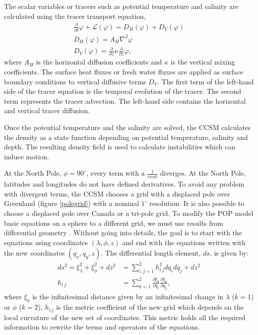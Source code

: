 The scalar variables or tracers such as potential temperature and salinity are calculated using the tracer transport equation,
\begingroup \belowdisplayskip=0pt \abovedisplayskip=0pt
\begin{gather}
\frac{\partial}{\partial t}\varphi + \mathcal{L}(\varphi) = D_H(\varphi)+D_V(\varphi)\\
D_H(\varphi) = A_H\nabla^2\varphi\\
D_V(\varphi) = \frac{\partial}{\partial z}\kappa\frac{\partial}{\partial z}\varphi,
\end{gather}
\endgroup
where $A_H$ is the horizontal diffusion coefficients and $\kappa$ is the vertical mixing coefficients. The surface heat fluxes or fresh water fluxes are applied as surface boundary conditions to vertical diffusive terms $D_V$. The first term of the left-hand side of the tracer equation is the temporal evolution of the tracer. The second term represents the tracer advection. The left-hand side contains the horizontal and vertical tracer diffusion.

Once the potential temperature and the salinity are solved, the CCSM calculates the density as a state function depending on potential temperature, salinity and depth. The resulting density field is used to calculate instabilities which can induce motion. 

At the North Pole, $\phi = 90^\circ$, every term with a $\frac{1}{cos \phi}$ diverges. At the North Pole, latitudes and longitudes do not have defined derivatives. To avoid any problem with divergent terms, the CCSM chooses a grid with a displaced pole over Greenland (figure \ref{polegrid}) with a nominal $1^\circ$ resolution. It is also possible to choose a displaced pole over Canada or a tri-pole grid. To modify the POP model basic equations on a sphere to a different grid, we must use results from differential geometry \citep{EDG}. Without going into details, the goal is to start with the equations using coordinates $(\lambda,\phi,z)$ and end with the equations written with the new coordinates $(q_x,q_y,z)$. The differential length element, $ds$, is given by:
\begin{align}
ds^2 = \xi_\lambda^2 + \xi_\phi^2 + dz^2 &= \sum_{i,j=1}^2 h_{i\,j}^2 dq_i dq_j + dz^2\\
h_{i\,j} &= \sum_{k=1}^2 \frac{\partial \xi_k}{\partial q_i}\frac{\partial \xi_k}{\partial q_j},
\end{align}
where $\xi_k$ is the infinitesimal distance given by an infinitesimal change in $\lambda$ ($k=1$) or $\phi$ ($k=2$), $h_{i\,j}$ is the metric coefficient of the new grid which depends on the local curvature of the new set of coordinates. This metric holds all the required information to rewrite the terms and operators of the equations. 

